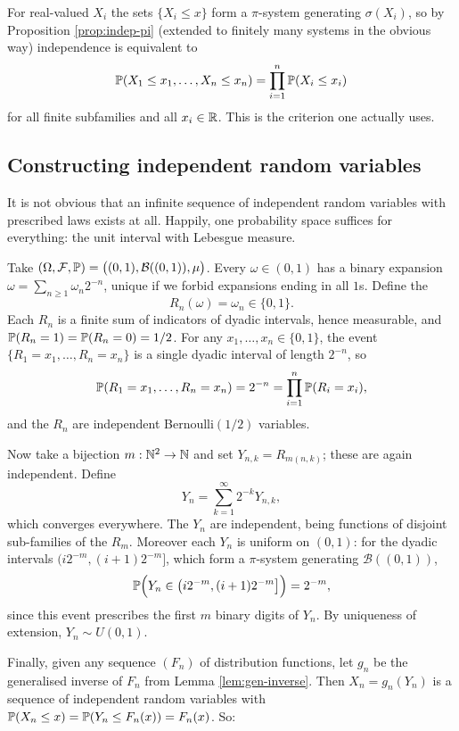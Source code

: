 \documentclass[a4paper]{scrartcl}
\newcommand{\cB}{\mathcal{B}}
\newcommand{\cF}{\mathcal{F}}
\begin{document}
For real-valued $X_i$ the sets $\{X_i \leq x\}$ form a $\pi$-system generating $\sigma(X_i)$, so by Proposition \ref{prop:indep-pi} (extended to finitely many systems in the obvious way) independence is equivalent to
$$
\mathbb{P}(X_1 \leq x_1, \dots, X_n \leq x_n) = \prod_{i=1}^n \mathbb{P}(X_i \leq x_i)
$$
for all finite subfamilies and all $x_i \in \mathbb{R}$. This is the criterion one actually uses.

\subsection{Constructing independent random variables}

It is not obvious that an infinite sequence of independent random variables with prescribed laws exists at all. Happily, one probability space suffices for everything: the unit interval with Lebesgue measure.

Take $(\Omega, \cF, \PP) = \big((0,1), \cB((0,1)), \mu\big)$. Every $\omega \in (0,1)$ has a binary expansion $\omega = \sum_{n\geq 1} \omega_n 2^{-n}$, unique if we forbid expansions ending in all $1$s. Define the 
$$
R_n(\omega) = \omega_n \in \{0,1\}.
$$
Each $R_n$ is a finite sum of indicators of dyadic intervals, hence measurable, and $\mathbb{P}(R_n = 1) = \mathbb{P}(R_n = 0) = 1/2$. For any $x_1,\dots,x_n \in \{0,1\}$, the event $\{R_1 = x_1,\dots,R_n = x_n\}$ is a single dyadic interval of length $2^{-n}$, so
$$
\mathbb{P}(R_1 = x_1, \dots, R_n = x_n) = 2^{-n} = \prod_{i=1}^n \mathbb{P}(R_i = x_i),
$$
and the $R_n$ are independent Bernoulli$(1/2)$ variables.

Now take a bijection $m : \mathbb{N}^2 \to \mathbb{N}$ and set $Y_{n,k} = R_{m(n,k)}$; these are again independent. Define
$$
Y_n = \sum_{k=1}^\infty 2^{-k} Y_{n,k},
$$
which converges everywhere. The $Y_n$ are independent, being functions of disjoint sub-families of the $R_m$. Moreover each $Y_n$ is uniform on $(0,1)$: for the dyadic intervals $\big(i2^{-m}, (i+1)2^{-m}\big]$, which form a $\pi$-system generating $\cB((0,1))$,
$$
\mathbb{P}\Big( Y_n \in \big(i2^{-m}, (i+1)2^{-m}\big] \Big) = 2^{-m},
$$
since this event prescribes the first $m$ binary digits of $Y_n$. By uniqueness of extension, $Y_n \sim U(0,1)$.

Finally, given any sequence $(F_n)$ of distribution functions, let $g_n$ be the generalised inverse of $F_n$ from Lemma \ref{lem:gen-inverse}. Then $X_n = g_n(Y_n)$ is a sequence of independent random variables with $\mathbb{P}(X_n \leq x) = \mathbb{P}(Y_n \leq F_n(x)) = F_n(x)$. So:
\end{document}
